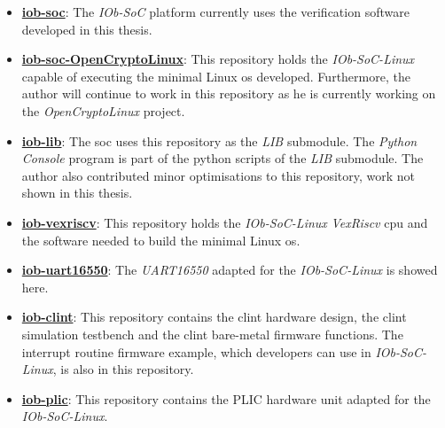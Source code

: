 \begin{itemize}
    \item \href{https://github.com/IObundle/iob-soc}{\textbf{iob-soc}}: The \textit{IOb-SoC} platform currently uses the verification software developed in this thesis.
    \item \href{https://github.com/IObundle/iob-soc-opencryptolinux}{\textbf{iob-soc-OpenCryptoLinux}}: This repository holds the \textit{IOb-SoC-Linux} capable of executing the minimal Linux \acrshort{os} developed. Furthermore, the author will continue to work in this repository as he is currently working on the \textit{OpenCryptoLinux} project.
    \item \href{https://github.com/IObundle/iob-lib}{\textbf{iob-lib}}: The \acrshort{soc} uses this repository as the \textit{LIB} submodule. The \textit{Python} \textit{Console} program is part of the python scripts of the \textit{LIB} submodule. The author also contributed minor optimisations to this repository, work not shown in this thesis.
    \item \href{https://github.com/IObundle/iob-vexriscv}{\textbf{iob-vexriscv}}: This repository holds the \textit{IOb-SoC-Linux} \textit{VexRiscv} \acrshort{cpu} and the software needed to build the minimal Linux \acrshort{os}.
    \item \href{https://github.com/IObundle/iob-uart16550}{\textbf{iob-uart16550}}: The \textit{UART16550} adapted for the \textit{IOb-SoC-Linux} is showed here.
    \item \href{https://github.com/IObundle/iob-clint}{\textbf{iob-clint}}: This repository contains the \acrshort{clint} hardware design, the \acrshort{clint} simulation testbench and the \acrshort{clint} bare-metal firmware functions. The interrupt routine firmware example, which developers can use in \textit{IOb-SoC-Linux}, is also in this repository.
    \item \href{https://github.com/IObundle/iob-plic}{\textbf{iob-plic}}: This repository contains the PLIC hardware unit adapted for the \textit{IOb-SoC-Linux}.
\end{itemize}

